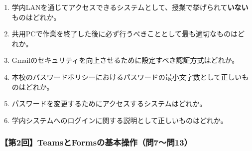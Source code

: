 \documentclass[b4paper,7pt,twocolumn,landscape]{jsarticle}
\begin{document}
\begin{enumerate}
\item 学内LANを通じてアクセスできるシステムとして、授業で挙げられて\textbf{いない}ものはどれか。\\

\item 共用PCで作業を終了した後に必ず行うべきこととして最も適切なものはどれか。\\

\item Gmailのセキュリティを向上させるために設定すべき認証方式はどれか。\\

\item 本校のパスワードポリシーにおけるパスワードの最小文字数として正しいものはどれか。\\

\item パスワードを変更するためにアクセスするシステムはどれか。\\

\item 学内システムへのログインに関する説明として正しいものはどれか。\\
\end{enumerate}

\subsubsection*{【第2回】TeamsとFormsの基本操作（問7〜問13）}
\end{document}

